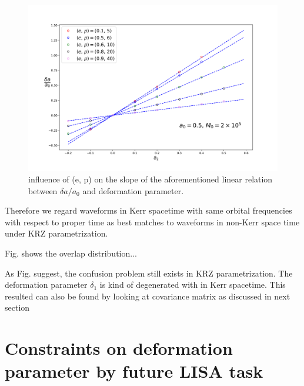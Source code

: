 \documentclass{article}
\begin{document}
\begin{figure}[!htb]
	\centering
	\includegraphics[width=16cm]{d2_deltaspin_ep.png}

	\caption{influence of (e, p) on the slope of the aforementioned linear relation between $\delta a/a_0$ and deformation parameter. }
	\label{ep_slope}
\end{figure}
	
Therefore we regard waveforms in Kerr spacetime with same orbital frequencies with respect to proper time as best matches to waveforms in non-Kerr space time under KRZ parametrization.

Fig. shows the overlap distribution...

As Fig. suggest, the confusion problem still exists in KRZ parametrization. The deformation parameter $\delta_1$ is kind of degenerated with   in Kerr spacetime. This resulted can also be found by looking at covariance matrix as discussed in next section
\section{Constraints on deformation parameter by future LISA task}



\end{document}
